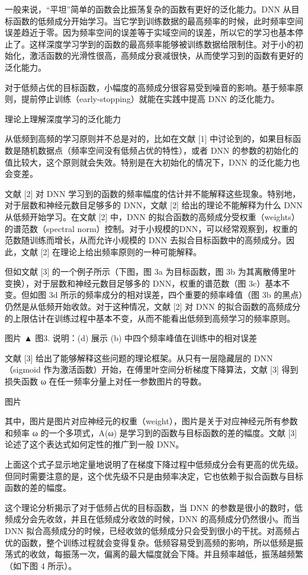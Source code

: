一般来说，“平坦”简单的函数会比振荡复杂的函数有更好的泛化能力。DNN 从目标函数的低频成分开始学习。当它学到训练数据的最高频率的时候，此时频率空间误差趋近于零。因为频率空间的误差等于实域空间的误差，所以它的学习也基本停止了。这样深度学习学到的函数的最高频率能够被训练数据给限制住。对于小的初始化，激活函数的光滑性很高，高频成分衰减很快，从而使学习到的函数有更好的泛化能力。

对于低频占优的目标函数，小幅度的高频成分很容易受到噪音的影响。基于频率原则，提前停止训练（early-stopping）就能在实践中提高 DNN 的泛化能力。

理论上理解深度学习的泛化能力


从低频到高频的学习原则并不总是对的，比如在文献 [1] 中讨论到的，如果目标函数是随机数据点（频率空间没有低频占优的特性），或者 DNN 的参数的初始化的值比较大，这个原则就会失效。特别是在大初始化的情况下，DNN 的泛化能力也会变差。

文献 [2] 对 DNN 学习到的函数的频率幅度的估计并不能解释这些现象。特别地，对于层数和神经元数目足够多的 DNN，文献 [2] 给出的理论不能解释为什么 DNN 从低频开始学习。在文献 [2] 中，DNN 的拟合函数的高频成分受权重（weights）的谱范数（spectral norm）控制。对于小规模的DNN，可以经常观察到，权重的范数随训练而增长，从而允许小规模的 DNN 去拟合目标函数中的高频成分。因此，文献 [2] 在理论上给出频率原则的一种可能解释。

但如文献 [3] 的一个例子所示（下图，图 3a 为目标函数，图 3b 为其离散傅里叶变换），对于层数和神经元数目足够多的 DNN，权重的谱范数（图 3c）基本不变。但如图 3d 所示的频率成分的相对误差，四个重要的频率峰值（图 3b 的黑点）仍然是从低频开始收敛。对于这种情况，文献 [2] 对 DNN 的拟合函数的高频成分的上限估计在训练过程中基本不变，从而不能看出低频到高频学习的频率原则。

图片
▲ 图3. 说明：(d) 展示 (b) 中四个频率峰值在训练中的相对误差

文献 [3] 给出了能够解释这些问题的理论框架。从只有一层隐藏层的 DNN（sigmoid 作为激活函数）开始，在傅里叶空间分析梯度下降算法，文献 [3] 得到损失函数 ω 在任一频率分量上对任一参数图片的导数。

图片

其中，图片是图片对应神经元的权重（weight），图片是关于对应神经元所有参数和频率 ω 的一个多项式，A(ω) 是学习到的函数与目标函数的差的幅度。文献 [3] 论述了这个表达式如何定性的推广到一般 DNN。

上面这个式子显示地定量地说明了在梯度下降过程中低频成分会有更高的优先级。但同时需要注意的是，这个优先级不只是由频率决定，它也依赖于拟合函数与目标函数的差的幅度。

这个理论分析揭示了对于低频占优的目标函数，当 DNN 的参数是很小的数时，低频成分会先收敛，并且在低频成分收敛的时候，DNN 的高频成分仍然很小。而当 DNN 拟合高频成分的时候，已经收敛的低频成分只会受到很小的干扰。对高频占优的函数，整个训练过程就会变得复杂。低频容易受到高频的影响，所以低频是振荡式的收敛，每振荡一次，偏离的最大幅度就会下降。并且频率越低，振荡越频繁（如下图 4 所示）。

